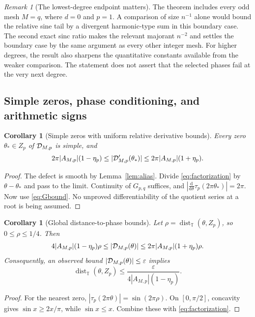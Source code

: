 \documentclass[11pt,a4paper]{article}
\numberwithin{equation}{section}
\newtheorem{corollary}[theorem]{Corollary}
\theoremstyle{definition}
\theoremstyle{remark}
\newtheorem{remark}[theorem]{Remark}
\newcommand{\T}{\mathbb T}\newcommand{\C}{\mathbb C}
\begin{document}
\begin{remark}[The lowest-degree endpoint matters]
The theorem includes every odd mesh $M=q$, where $d=0$ and $p=1$.
A comparison of size $n^{-1}$ alone would bound the relative sine tail
by a divergent harmonic-type sum in this boundary case. The second
exact sinc ratio makes the relevant majorant $n^{-2}$ and settles the
boundary case by the same argument as every other integer mesh.
For higher degrees, the result also sharpens the quantitative constants
available from the weaker comparison. The statement does not assert
that the selected phases fail at the very next degree.
\end{remark}

\subsection{Simple zeros, phase conditioning, and arithmetic signs}

\begin{corollary}[Simple zeros with uniform relative derivative bounds]
\label{cor:simplezeros}
Every zero $\theta_*\in Z_p$ of $\mathcal D_{M,p}$ is simple, and
\begin{equation}
 2\pi|A_{M,p}|(1-\eta_p)
 \le |\mathcal D'_{M,p}(\theta_*)|
 \le2\pi|A_{M,p}|(1+\eta_p).
 \label{eq:root-slope}
\end{equation}
\end{corollary}
\begin{proof}
The defect is smooth by Lemma~\ref{lem:alias}. Divide
\eqref{eq:factorization} by $\theta-\theta_*$ and pass to the limit.
Continuity of $G_{p,q}$ suffices, and
$|\frac{\mathrm d}{\mathrm d\theta}\tau_p(2\pi\theta_*)|=2\pi$.
Now use \eqref{eq:Gbound}. No unproved differentiability of the quotient
series at a root is being assumed.
\end{proof}

\begin{corollary}[Global distance-to-phase bounds]
\label{cor:phase-distance}
Let $\rho=\operatorname{dist}_{\T}(\theta,Z_p)$, so $0\le\rho\le1/4$.
Then
\begin{equation}
 4|A_{M,p}|(1-\eta_p)\rho
 \le |\mathcal D_{M,p}(\theta)|
 \le2\pi|A_{M,p}|(1+\eta_p)\rho.
 \label{eq:phase-distance}
\end{equation}
Consequently, an observed bound
$|\mathcal D_{M,p}(\theta)|\le\varepsilon$ implies
\begin{equation}
 \operatorname{dist}_{\T}(\theta,Z_p)
 \le\frac{\varepsilon}{4|A_{M,p}|(1-\eta_p)}.
 \label{eq:phase-certificate}
\end{equation}
\end{corollary}
\begin{proof}
For the nearest zero, $|\tau_p(2\pi\theta)|=\sin(2\pi\rho)$.
On $[0,\pi/2]$, concavity gives $\sin x\ge2x/\pi$, while
$\sin x\le x$. Combine these with \eqref{eq:factorization}.
\end{proof}
\end{document}
